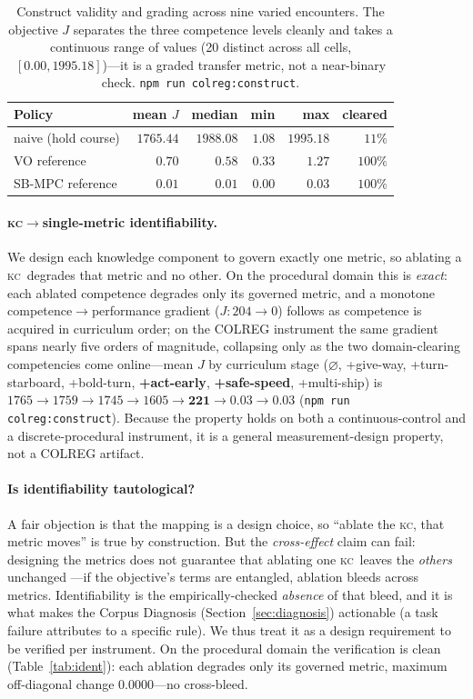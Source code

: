 \documentclass{article}
\newcommand{\kc}{\textsc{kc}}
\begin{document}
\begin{table}[t]
\centering
\small
\begin{tabular}{@{}lrrrrr@{}}
\toprule
Policy & mean $J$ & median & min & max & cleared \\
\midrule
naive (hold course) & $1765.44$ & $1988.08$ & $1.08$ & $1995.18$ & $11\%$ \\
VO reference & $0.70$ & $0.58$ & $0.33$ & $1.27$ & $100\%$ \\
SB-MPC reference & $0.01$ & $0.01$ & $0.00$ & $0.03$ & $100\%$ \\
\bottomrule
\end{tabular}
\caption{Construct validity and grading across nine varied encounters. The objective $J$
separates the three competence levels cleanly and takes a continuous range of values
(20 distinct across all cells, $[0.00, 1995.18]$)---it is a graded transfer metric, not a
near-binary check. \texttt{npm run colreg:construct}.}
\label{tab:construct}
\end{table}

\paragraph{\kc$\to$single-metric identifiability.} We design each knowledge component to
govern exactly one metric, so ablating a \kc\ degrades that metric and no other. On the
procedural domain this is \emph{exact}: each ablated competence degrades only its governed
metric, and a monotone competence$\to$performance gradient ($J:204\to 0$) follows as
competence is acquired in curriculum order; on the COLREG instrument the same gradient spans
nearly five orders of magnitude, collapsing only as the two domain-clearing competencies come
online---mean $J$ by curriculum stage ($\varnothing$, {+}give-way, {+}turn-starboard, {+}bold-turn,
\textbf{{+}act-early}, \textbf{{+}safe-speed}, {+}multi-ship) is
$1765\!\to\!1759\!\to\!1745\!\to\!1605\!\to\!\mathbf{221}\!\to\!\mathbf{0.03}\!\to\!0.03$
(\texttt{npm run colreg:construct}). Because the property holds on both a
continuous-control and a discrete-procedural instrument, it is a general measurement-design
property, not a COLREG artifact.

\paragraph{Is identifiability tautological?} A fair objection is that the mapping is a design choice, so
``ablate the \kc, that metric moves'' is true by construction. But the \emph{cross-effect} claim can
fail: designing the metrics does not guarantee that ablating one \kc\ leaves the \emph{others} unchanged
---if the objective's terms are entangled, ablation bleeds across metrics. Identifiability is the
empirically-checked \emph{absence} of that bleed, and it is what makes the Corpus Diagnosis
(Section~\ref{sec:diagnosis}) actionable (a task failure attributes to a specific rule). We thus treat it
as a design requirement to be verified per instrument. On the procedural domain the verification is clean
(Table~\ref{tab:ident}): each ablation degrades only its governed metric, maximum off-diagonal change
$0.0000$---no cross-bleed.
\end{document}
